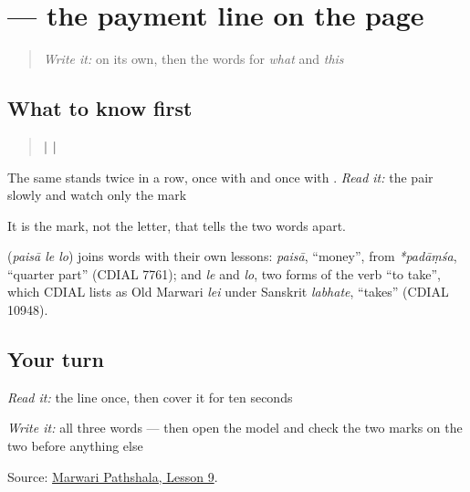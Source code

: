 \section[\texorpdfstring{\mw{पैसा} \mw{ले} \mw{लो।} (paisā le lo.)}{पैसा ले लो। (paisā le lo.)}]{   — the payment line on the page}

\label{lesson:MW-C24-pay}



\begin{quote}
\emph{Write it:} \textbf{} on its own, then the words for \emph{what} and \emph{this}
\end{quote}

\subsection*{What to know first}
\begin{quote}
\textbf{ |  | }
\end{quote}

The same \textbf{} stands twice in a row, once with \textbf{} and once with \textbf{}. \emph{Read it:} the pair slowly and watch only the mark

It is the mark, not the letter, that tells the two words apart.

\begin{cousinweb}
\textbf{  } (\emph{paisā le lo}) joins words with their own lessons: \emph{paisā}, \textquotedblleft{}money\textquotedblright{}, from \emph{*padāṃśa}, \textquotedblleft{}quarter part\textquotedblright{} (CDIAL 7761); and \emph{le} and \emph{lo}, two forms of the verb \textquotedblleft{}to take\textquotedblright{}, which CDIAL lists as Old Marwari \emph{lei} under Sanskrit \emph{labhate}, \textquotedblleft{}takes\textquotedblright{} (CDIAL 10948).
\end{cousinweb}

\subsection*{Your turn}
\emph{Read it:} the line once, then cover it for ten seconds

\emph{Write it:} all three words — then open the model and check the two marks on the two \textbf{} before anything else

\begin{tcolorbox}[breakable,colback=teal!4,colframe=teal!35!black,title={Before you move on}]
Source: \href{https://www.marwaripathshala.com/marwari-lesson-9-english}{Marwari Pathshala, Lesson 9}.
\end{tcolorbox}
